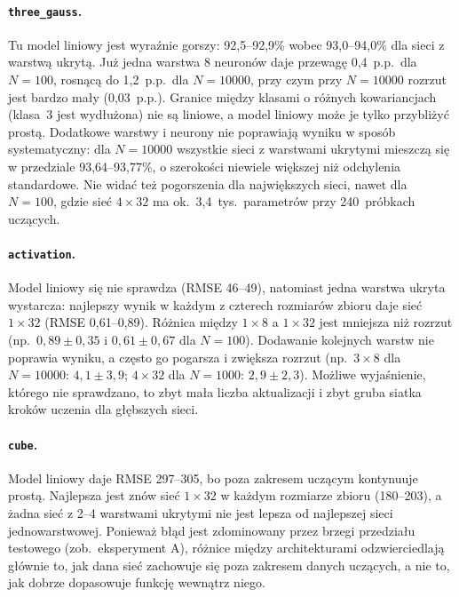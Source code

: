 \documentclass[11pt,a4paper]{article}
\begin{document}
	\paragraph{\texttt{three\_gauss}.} Tu model liniowy jest wyraźnie gorszy: 92,5--92,9\% wobec 93,0--94,0\% dla sieci z warstwą ukrytą. Już jedna warstwa 8 neuronów daje przewagę 0,4~p.p.\ dla $N=100$, rosnącą do 1,2~p.p.\ dla $N=10000$, przy czym przy $N=10000$ rozrzut jest bardzo mały (0,03~p.p.). Granice między klasami o różnych kowariancjach (klasa~3 jest wydłużona) nie są liniowe, a model liniowy może je tylko przybliżyć prostą. Dodatkowe warstwy i neurony nie poprawiają wyniku w sposób systematyczny: dla $N=10000$ wszystkie sieci z warstwami ukrytymi mieszczą się w przedziale 93,64--93,77\%, o szerokości niewiele większej niż odchylenia standardowe. Nie widać też pogorszenia dla największych sieci, nawet dla $N=100$, gdzie sieć $4\times32$ ma ok.\ 3,4~tys.\ parametrów przy 240~próbkach uczących.
	
	\paragraph{\texttt{activation}.} Model liniowy się nie sprawdza (RMSE 46--49), natomiast jedna warstwa ukryta wystarcza: najlepszy wynik w każdym z czterech rozmiarów zbioru daje sieć $1\times32$ (RMSE 0,61--0,89). Różnica między $1\times8$ a $1\times32$ jest mniejsza niż rozrzut (np.\ $0{,}89\pm0{,}35$ i $0{,}61\pm0{,}67$ dla $N=100$). Dodawanie kolejnych warstw nie poprawia wyniku, a często go pogarsza i zwiększa rozrzut (np.\ $3\times8$ dla $N=10000$: $4{,}1\pm3{,}9$; $4\times32$ dla $N=1000$: $2{,}9\pm2{,}3$). Możliwe wyjaśnienie, którego nie sprawdzano, to zbyt mała liczba aktualizacji i zbyt gruba siatka kroków uczenia dla głębszych sieci.
	
	\paragraph{\texttt{cube}.} Model liniowy daje RMSE 297--305, bo poza zakresem uczącym kontynuuje prostą. Najlepsza jest znów sieć $1\times32$ w każdym rozmiarze zbioru (180--203), a żadna sieć z 2--4 warstwami ukrytymi nie jest lepsza od najlepszej sieci jednowarstwowej. Ponieważ błąd jest zdominowany przez brzegi przedziału testowego (zob.\ eksperyment A), różnice między architekturami odzwierciedlają głównie to, jak dana sieć zachowuje się poza zakresem danych uczących, a nie to, jak dobrze dopasowuje funkcję wewnątrz niego.
	
\end{document}
